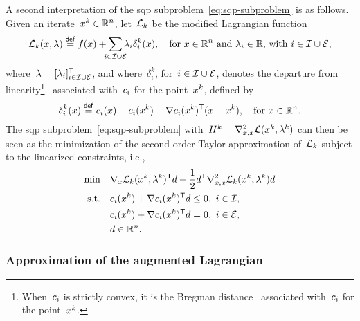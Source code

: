 A second interpretation of the \gls{sqp} subproblem~\cref{eq:sqp-subproblem} is as follows.
Given an iterate~$\iter[k] \in \R^n$, let~$\lag[k]$ be the modified Lagrangian function
\begin{equation*}
    \lag[k](\iter, \lm) \eqdef \obj(\iter) + \sum_{\mathclap{i \in \iub \cup \ieq}} \lm_i \delta_i^k(\iter), \quad \text{for~$\iter \in \R^n$ and~$\lm_i \in \R$, with~$i \in \iub \cup \ieq$},
\end{equation*}
where~$\lm = [\lm_i]_{i \in \iub \cup \ieq}^{\T}$, and where~$\delta_i^k$, for~$i \in \mathcal{I} \cup \mathcal{E}$, denotes the departure from linearity\footnote{When~$c_{i}$ is strictly convex, it is the Bregman distance~\cite{Bregman_1967} associated with~$c_{i}$ for the point~$\iter[k]$.}~\cite{Robinson_1972,Hoek_1982} associated with~$c_{i}$ for the point~$\iter[k]$, defined by
\begin{equation*}
    \delta_i^k(\iter) \eqdef \con{i}(\iter) - \con{i}(\iter[k]) - \nabla \con{i}(\iter[k])^{\T} (\iter - \iter[k]), \quad \text{for~$\iter \in \R^n$.}
\end{equation*}
The \gls{sqp} subproblem~\cref{eq:sqp-subproblem} with~$H^k = \nabla_{x, x}^2 \lag(\iter[k], \lm[k])$ can then be seen as the minimization of the second-order Taylor approximation of~$\lag[k]$ subject to the linearized constraints, i.e.,
\begin{align*}
    \min        & \quad \nabla_x \lag[k](\iter[k], \lm[k])^{\T} \step + \frac{1}{2} \step^{\T} \nabla_{x, x}^2 \lag[k](\iter[k], \lm[k]) \step\\
    \text{s.t.} & \quad \con{i}(\iter[k]) + \nabla \con{i}(\iter[k])^{\T} \step \le 0, ~ i \in \iub,\\
                & \quad \con{i}(\iter[k]) + \nabla \con{i}(\iter[k])^{\T} \step = 0, ~ i \in \ieq,\\
                & \quad \step \in \R^n.
\end{align*}

\subsubsection{Approximation of the augmented Lagrangian}

